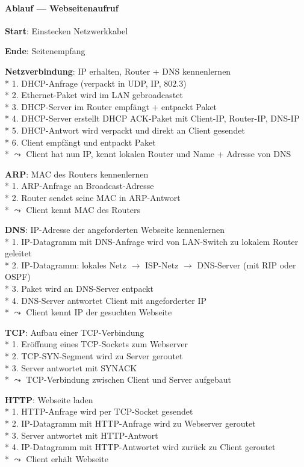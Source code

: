 \paragraph{Ablauf --- Webseitenaufruf}
\begin{items}
  \item \textbf{Start}: Einstecken Netzwerkkabel
  \item \textbf{Ende}: Seitenempfang
  \item \textbf{Netzverbindung}: IP erhalten, Router + DNS kennenlernen \\*
    1. DHCP-Anfrage (verpackt in UDP, IP, 802.3) \\*
    2. Ethernet-Paket wird im LAN gebroadcastet \\*
    3. DHCP-Server im Router empfängt + entpackt Paket \\*
    4. DHCP-Server erstellt DHCP ACK-Paket mit Client-IP, Router-IP, DNS-IP \\*
    5. DHCP-Antwort wird verpackt und direkt an Client gesendet \\*
    6. Client empfängt und entpackt Paket \\*
    \( \leadsto \) Client hat nun IP, kennt lokalen Router und Name + Adresse von DNS
  \item \textbf{ARP}: MAC des Routers kennenlernen \\*
    1. ARP-Anfrage an Broadcast-Adresse \\*
    2. Router sendet seine MAC in ARP-Antwort \\*
    \( \leadsto \) Client kennt MAC des Routers
  \item \textbf{DNS}: IP-Adresse der angeforderten Webseite kennenlernen \\*
    1. IP-Datagramm mit DNS-Anfrage wird von LAN-Switch zu lokalem Router geleitet \\*
    2. IP-Datagramm: lokales Netz \( \to \) ISP-Netz \( \to \) DNS-Server (mit RIP oder OSPF) \\*
    3. Paket wird an DNS-Server entpackt \\*
    4. DNS-Server antwortet Client mit angeforderter IP \\*
    \( \leadsto \) Client kennt IP der gesuchten Webseite
  \item \textbf{TCP}: Aufbau einer TCP-Verbindung \\*
    1. Eröffnung eines TCP-Sockets zum Webserver \\*
    2. TCP-SYN-Segment wird zu Server geroutet \\*
    3. Server antwortet mit SYNACK \\*
    \( \leadsto \) TCP-Verbindung zwischen Client und Server aufgebaut
  \item \textbf{HTTP}: Webseite laden \\*
    1. HTTP-Anfrage wird per TCP-Socket gesendet \\*
    2. IP-Datagramm mit HTTP-Anfrage wird zu Webserver geroutet \\*
    3. Server antwortet mit HTTP-Antwort \\*
    4. IP-Datagramm mit HTTP-Antwortet wird zurück zu Client geroutet \\*
    \( \leadsto \) Client erhält Webseite
\end{items}